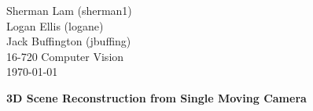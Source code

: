 \documentclass[11pt]{article}
\begin{document}
\begin{flushleft}
Sherman Lam (sherman1) \\
Logan Ellis (logane) \\
Jack Buffington (jbuffing)  \\
16-720 Computer Vision\\
\today
\end{flushleft}



\begin{center}
\begin{Large}
\textbf{3D Scene Reconstruction from Single Moving Camera}
\end{Large}
\end{center}








\clearpage


\end{document}
